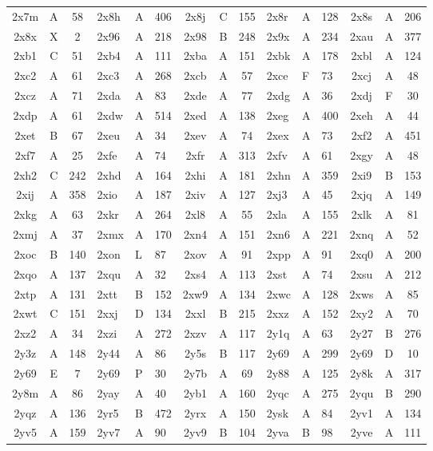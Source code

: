 \begin{longtable}{|c|c|c| a|a|a| c|c|c| a|a|a| c|c|c|}
2x7m & A & 58 & 2x8h & A & 406 & 2x8j & C & 155 & 2x8r & A & 128 & 2x8s & A & 206\\
2x8x & X & 2 & 2x96 & A & 218 & 2x98 & B & 248 & 2x9x & A & 234 & 2xau & A & 377\\
2xb1 & C & 51 & 2xb4 & A & 111 & 2xba & A & 151 & 2xbk & A & 178 & 2xbl & A & 124\\
2xc2 & A & 61 & 2xc3 & A & 268 & 2xcb & A & 57 & 2xce & F & 73 & 2xcj & A & 48\\
2xcz & A & 71 & 2xda & A & 83 & 2xde & A & 77 & 2xdg & A & 36 & 2xdj & F & 30\\
2xdp & A & 61 & 2xdw & A & 514 & 2xed & A & 138 & 2xeg & A & 400 & 2xeh & A & 44\\
2xet & B & 67 & 2xeu & A & 34 & 2xev & A & 74 & 2xex & A & 73 & 2xf2 & A & 451\\
2xf7 & A & 25 & 2xfe & A & 74 & 2xfr & A & 313 & 2xfv & A & 61 & 2xgy & A & 48\\
2xh2 & C & 242 & 2xhd & A & 164 & 2xhi & A & 181 & 2xhn & A & 359 & 2xi9 & B & 153\\
2xij & A & 358 & 2xio & A & 187 & 2xiv & A & 127 & 2xj3 & A & 45 & 2xjq & A & 149\\
2xkg & A & 63 & 2xkr & A & 264 & 2xl8 & A & 55 & 2xla & A & 155 & 2xlk & A & 81\\
2xmj & A & 37 & 2xmx & A & 170 & 2xn4 & A & 151 & 2xn6 & A & 221 & 2xnq & A & 52\\
2xoc & B & 140 & 2xon & L & 87 & 2xov & A & 91 & 2xpp & A & 91 & 2xq0 & A & 200\\
2xqo & A & 137 & 2xqu & A & 32 & 2xs4 & A & 113 & 2xst & A & 74 & 2xsu & A & 212\\
2xtp & A & 131 & 2xtt & B & 152 & 2xw9 & A & 134 & 2xwc & A & 128 & 2xws & A & 85\\
2xwt & C & 151 & 2xxj & D & 134 & 2xxl & B & 215 & 2xxz & A & 152 & 2xy2 & A & 70\\
2xz2 & A & 34 & 2xzi & A & 272 & 2xzv & A & 117 & 2y1q & A & 63 & 2y27 & B & 276\\
2y3z & A & 148 & 2y44 & A & 86 & 2y5s & B & 117 & 2y69 & A & 299 & 2y69 & D & 10\\
2y69 & E & 7 & 2y69 & P & 30 & 2y7b & A & 69 & 2y88 & A & 125 & 2y8k & A & 317\\
2y8m & A & 86 & 2yay & A & 40 & 2yb1 & A & 160 & 2yqc & A & 275 & 2yqu & B & 290\\
2yqz & A & 136 & 2yr5 & B & 472 & 2yrx & A & 150 & 2ysk & A & 84 & 2yv1 & A & 134\\
2yv5 & A & 159 & 2yv7 & A & 90 & 2yv9 & B & 104 & 2yva & B & 98 & 2yve & A & 111\\

\end{longtable}
